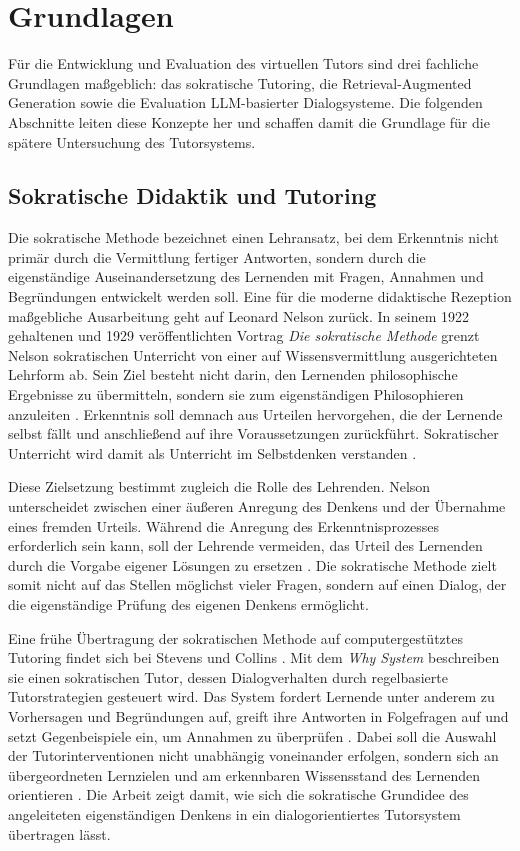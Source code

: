 \section{Grundlagen}
\label{sec:grundlagen}
 
Für die Entwicklung und Evaluation des virtuellen Tutors sind drei fachliche Grundlagen maßgeblich: das sokratische Tutoring, die Retrieval-Augmented Generation sowie die Evaluation LLM-basierter Dialogsysteme. Die folgenden Abschnitte leiten diese Konzepte her und schaffen damit die Grundlage für die spätere Untersuchung des Tutorsystems.
 
\subsection{Sokratische Didaktik und Tutoring}
\label{subsec:sokratische didaktik}
 
Die sokratische Methode bezeichnet einen Lehransatz, bei dem Erkenntnis nicht primär durch die Vermittlung fertiger Antworten, sondern durch die eigenständige Auseinandersetzung des Lernenden mit Fragen, Annahmen und Begründungen entwickelt werden soll. Eine für die moderne didaktische Rezeption maßgebliche Ausarbeitung geht auf Leonard Nelson zurück. In seinem 1922 gehaltenen und 1929 veröffentlichten Vortrag \textit{Die sokratische Methode} grenzt Nelson sokratischen Unterricht von einer auf Wissensvermittlung ausgerichteten Lehrform ab. Sein Ziel besteht nicht darin, den Lernenden philosophische Ergebnisse zu übermitteln, sondern sie zum eigenständigen Philosophieren anzuleiten \cite{Nelson1929}. Erkenntnis soll demnach aus Urteilen hervorgehen, die der Lernende selbst fällt und anschließend auf ihre Voraussetzungen zurückführt. Sokratischer Unterricht wird damit als Unterricht im Selbstdenken verstanden \cite{Nelson1929}.
 
Diese Zielsetzung bestimmt zugleich die Rolle des Lehrenden. Nelson unterscheidet zwischen einer äußeren Anregung des Denkens und der Übernahme eines fremden Urteils. Während die Anregung des Erkenntnisprozesses erforderlich sein kann, soll der Lehrende vermeiden, das Urteil des Lernenden durch die Vorgabe eigener Lösungen zu ersetzen \cite{Nelson1929}. Die sokratische Methode zielt somit nicht auf das Stellen möglichst vieler Fragen, sondern auf einen Dialog, der die eigenständige Prüfung des eigenen Denkens ermöglicht.
 
Eine frühe Übertragung der sokratischen Methode auf computergestütztes Tutoring
findet sich bei Stevens und Collins \cite{StevensCollins1977}. Mit dem
\textit{Why System} beschreiben sie einen sokratischen Tutor, dessen
Dialogverhalten durch regelbasierte Tutorstrategien gesteuert wird. Das System
fordert Lernende unter anderem zu Vorhersagen und Begründungen auf, greift ihre
Antworten in Folgefragen auf und setzt Gegenbeispiele ein, um Annahmen zu
überprüfen \cite{StevensCollins1977}. Dabei soll die Auswahl der
Tutorinterventionen nicht unabhängig voneinander erfolgen, sondern sich an
übergeordneten Lernzielen und am erkennbaren Wissensstand des Lernenden
orientieren \cite{StevensCollins1977}. Die Arbeit zeigt damit, wie sich die
sokratische Grundidee des angeleiteten eigenständigen Denkens in ein
dialogorientiertes Tutorsystem übertragen lässt.
 
